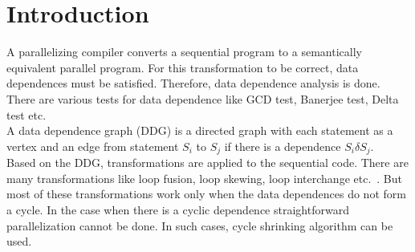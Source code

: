 \chapter{Introduction}


A parallelizing compiler converts a sequential program to a semantically equivalent parallel program. For this transformation to be correct, data dependences must be satisfied. Therefore, data dependence analysis is done. There are various tests for data dependence like GCD test, Banerjee test, Delta test etc.~\cite{allenoptimizing}\\

A data dependence graph (DDG) is a directed graph with each statement as a vertex and an edge from statement $S_i$ to $S_j$ if there is a dependence $S_i \delta S_j$. \\

Based on the DDG, transformations are applied to the sequential code. There are many transformations like loop fusion, loop skewing, loop interchange etc.~\cite{allenoptimizing}. But most of these transformations work only when the data dependences do not form a cycle. In the case when there is a cyclic dependence straightforward parallelization cannot be done. In such cases, cycle shrinking algorithm can be used.\\

